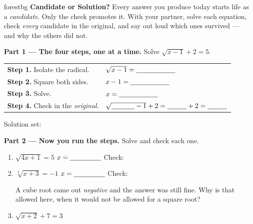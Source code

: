 \documentclass[10pt]{article}
\begin{document}
\namepartnerperiod

\vspace{0.08in}

\begin{headlinebox}{forestbg}
\small\textbf{Candidate or Solution?} Every answer you produce today starts life as a
\emph{candidate}. Only the check promotes it. With your partner, solve each equation, check
\emph{every} candidate in the original, and say out loud which ones survived --- and why the others
did not.
\end{headlinebox}

\vspace{0.06in}

\begin{tcolorbox}[colback=white, colframe=black!40, title=\textbf{Tier R --- Remediate},
    fonttitle=\bfseries, arc=1.5mm, left=3mm, right=3mm, top=2mm, bottom=2mm, breakable]
\textbf{Part 1 --- The four steps, one at a time.} \; Solve $\sqrt{x-1}+2=5$.
\begin{center}
\renewcommand{\arraystretch}{1.8}
\begin{tabularx}{0.94\linewidth}{@{}l X@{}}
\textbf{Step 1.} Isolate the radical. & $\sqrt{x-1}=\blank{2.0cm}$ \\
\textbf{Step 2.} Square both sides. & $x-1=\blank{2.0cm}$ \\
\textbf{Step 3.} Solve. & $x=\blank{2.0cm}$ \\
\textbf{Step 4.} Check in the \emph{original}. & $\sqrt{\blank{1.2cm}-1}+2=\blank{1.0cm}+2=\blank{1.0cm}$ \\
\end{tabularx}
\end{center}
Solution set: \blank{2.4cm}

\vspace{5pt}
\textbf{Part 2 --- Now you run the steps.} Solve and check each one.
\begin{enumerate}[leftmargin=1.8em, itemsep=6pt]
  \item $\sqrt{4x+1}=5$ \hfill $x=\blank{1.6cm}$ \quad Check: \blank{3.0cm}
        \vspace{0.30in}
  \item $\sqrt[3]{x+3}=-1$ \hfill $x=\blank{1.6cm}$ \quad Check: \blank{3.0cm}
        \vspace{0.30in}

        A cube root came out \emph{negative} and the answer was still fine. Why is that allowed
        here, when it would not be allowed for a square root? \blank{6.0cm}
  \item $\sqrt{x+2}+7=3$
        \vspace{0.10in}


\end{enumerate}
\end{tcolorbox}
\end{document}
